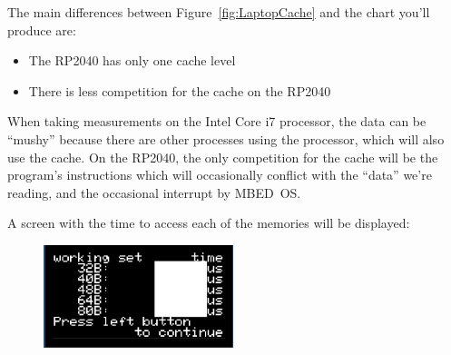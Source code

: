 The main differences between Figure~\ref{fig:LaptopCache} and the chart you'll produce are:

\begin{itemize}
    \item The RP2040 has only one cache level
    \item There is less competition for the cache on the RP2040
\end{itemize}

When taking measurements on the Intel Core i7 processor, the data can be ``mushy'' because there are other processes using the processor, which will also use the cache.
On the RP2040, the only competition for the cache will be the program's instructions which will occasionally conflict with the ``data'' we're reading,
and the occasional interrupt by MBED~OS\@.

\begin{description}
\end{description}

A screen with the time to access each of the memories will be displayed:

\begin{figure}[h]
    \includegraphics[height=3cm]{Mk4Screens/Option2Screen1}
\end{figure}

\newpage

\begin{description}
\end{description}

